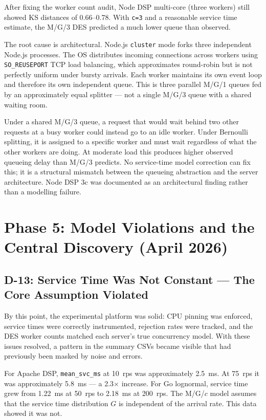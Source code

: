 After fixing the worker count audit, Node DSP multi-core (three workers) still showed KS distances of 0.66--0.78. With \texttt{c=3} and a reasonable service time estimate, the M/G/3 DES predicted a much lower queue than observed.

The root cause is architectural. Node.js \texttt{cluster} mode forks three independent Node.js processes. The OS distributes incoming connections across workers using \texttt{SO\_REUSEPORT} TCP load balancing, which approximates round-robin but is not perfectly uniform under bursty arrivals. Each worker maintains its own event loop and therefore its own independent queue. This is three parallel M/G/1 queues fed by an approximately equal splitter — not a single M/G/3 queue with a shared waiting room.

Under a shared M/G/3 queue, a request that would wait behind two other requests at a busy worker could instead go to an idle worker. Under Bernoulli splitting, it is assigned to a specific worker and must wait regardless of what the other workers are doing. At moderate load this produces higher observed queueing delay than M/G/3 predicts. No service-time model correction can fix this; it is a structural mismatch between the queueing abstraction and the server architecture. Node DSP 3c was documented as an architectural finding rather than a modelling failure.

\section{Phase 5: Model Violations and the Central Discovery (April 2026)}
\label{sec:journey-phase5}

\subsection{D-13: Service Time Was Not Constant — The Core Assumption Violated}

By this point, the experimental platform was solid: CPU pinning was enforced, service times were correctly instrumented, rejection rates were tracked, and the DES worker counts matched each server's true concurrency model. With these issues resolved, a pattern in the summary CSVs became visible that had previously been masked by noise and errors.

For Apache DSP, \texttt{mean\_svc\_ms} at 10~rps was approximately 2.5~ms. At 75~rps it was approximately 5.8~ms — a 2.3$\times$ increase. For Go lognormal, service time grew from 1.22~ms at 50~rps to 2.18~ms at 200~rps. The M/G/$c$ model assumes that the service time distribution $G$ is independent of the arrival rate. This data showed it was not.

